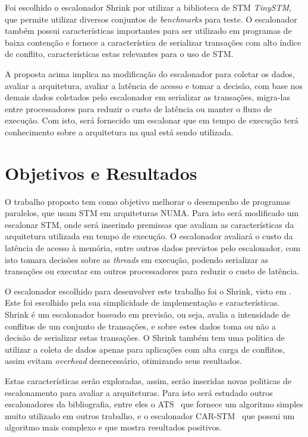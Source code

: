 \documentclass[diss-proposta,nocipinfo]{texufpel}
\begin{document}
Foi escolhido o escalonador Shrink por utilizar a biblioteca de STM \emph{TinySTM}, que permite utilizar diversos conjuntos de \emph{benchmarks} para teste. O escalonador também possui características importantes para ser utilizado em programas de baixa contenção e fornece a característica de serializar transações com alto índice de conflito, características estas relevantes para o uso de STM.

A proposta acima implica na modificação do escalonador para coletar os dados, avaliar a arquitetura, avaliar a latência de acesso e tomar a decisão, com base nos demais dados coletados pelo escalonador em serializar as transações, migra-las entre processadores para reduzir o custo de latência ou manter o fluxo de execução. Com isto, será fornecido um escalonar que em tempo de execução terá conhecimento sobre a arquitetura na qual está sendo utilizada.

\chapter{Objetivos e Resultados}

O trabalho proposto tem como objetivo melhorar o desempenho de programas paralelos, que usam STM em arquiteturas NUMA. Para isto será modificado um escalonar STM, onde será inserindo premissas que avaliam as características da arquitetura utilizada em tempo de execução. O escalonador avaliará o custo da latência de acesso à memória, entre outros dados previstos pelo escalonador, com isto tomara decisões sobre as \emph{threads} em execução, podendo serializar as transações ou executar em outros processadores para reduzir o custo de latência.

O escalonador escolhido para desenvolver este trabalho foi o Shrink, visto em \cite{dragojevic09}. Este foi escolhido pela sua simplicidade de implementação e características. Shrink é um escalonador baseado em previsão, ou seja, avalia a intensidade de conflitos de um conjunto de transações, e sobre estes dados toma ou não a decisão de serializar estas transações. O Shrink também tem uma politica de utilizar a coleta de dados apenas para aplicações com alta carga de conflitos, assim evitam \emph{overhead} desnecessário, otimizando seus resultados.

Estas características serão exploradas, assim, serão inseridas novas politicas de escalonamento para avaliar a arquiteturas. Para isto será estudado outros escalonadores da bibliografia, entre eles o ATS~\cite{yoo08} que fornece um algoritmo simples muito utilizado em outros trabalho, e o escalonador CAR-STM~\cite{dolev08} que possui um algoritmo mais complexo e que mostra resultados positivos.
\end{document}
